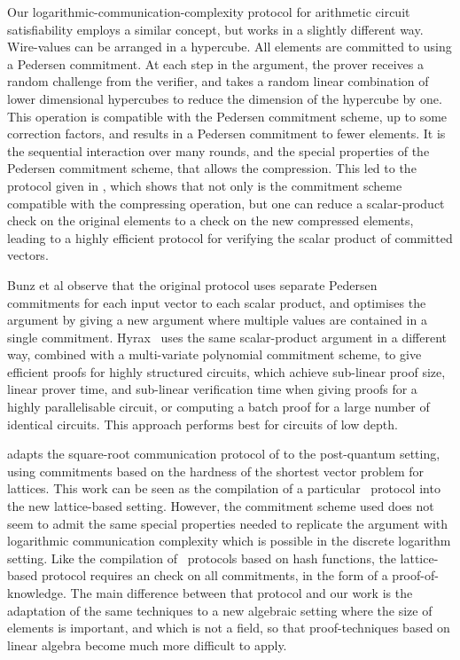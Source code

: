 Our logarithmic-communication-complexity protocol for arithmetic circuit satisfiability employs a similar concept, but works in a slightly different way. Wire-values can be arranged in a hypercube. All elements are committed to using a Pedersen commitment. At each step in the argument, the prover receives a random challenge from the verifier, and takes a random linear combination of lower dimensional hypercubes to reduce the dimension of the hypercube by one. This operation is compatible with the Pedersen commitment scheme, up to some correction factors, and results in a Pedersen commitment to fewer elements. It is the sequential interaction over many rounds, and the special properties of the Pedersen commitment scheme, that allows the compression. This led to the protocol given in \cite{BootleCCGP16}, which shows that not only is the commitment scheme compatible with the compressing operation, but one can reduce a scalar-product check on the original elements to a check on the new compressed elements, leading to a highly efficient protocol for verifying the scalar product of committed vectors. 

Bunz et al \cite{BunzBBPWM18} observe that the original protocol uses separate Pedersen commitments for each input vector to each scalar product, and optimises the argument by giving a new argument where multiple values are contained in a single commitment. Hyrax~\cite{WahbyTSTW18} uses the same scalar-product argument in a different way, combined with a multi-variate polynomial commitment scheme, to give efficient proofs for highly structured circuits, which achieve sub-linear proof size, linear prover time, and sub-linear verification time when giving proofs for a highly parallelisable circuit, or computing a batch proof for a large number of identical circuits. This approach performs best for circuits of low depth.

\cite{BaumBCPGL18} adapts the square-root communication protocol of \cite{BootleCCGP16} to the post-quantum setting, using commitments based on the hardness of the shortest vector problem for lattices. This work can be seen as the compilation of a particular \ILC\ protocol into the new lattice-based setting. However, the commitment scheme used does not seem to admit the same special properties needed to replicate the argument with logarithmic communication complexity which is possible in the discrete logarithm setting. Like the compilation of \ILC\ protocols based on hash functions, the lattice-based protocol requires an check on all commitments, in the form of a proof-of-knowledge. The main difference between that protocol and our work is the adaptation of the same techniques to a new algebraic setting where the size of elements is important, and which is not a field, so that proof-techniques based on linear algebra become much more difficult to apply.

